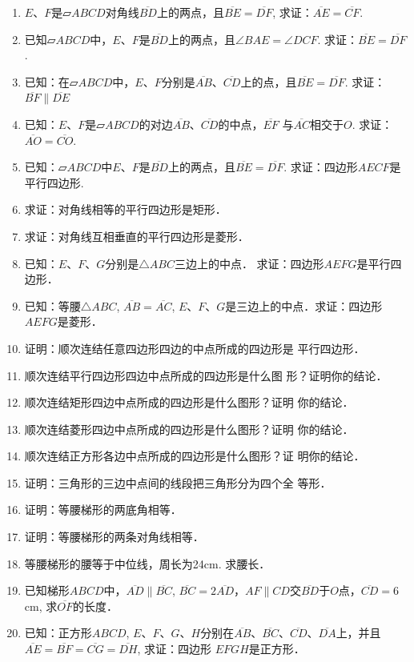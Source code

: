 \begin{ex}
\begin{enumerate}
    \item $E$、$F$是$\parallelogram ABCD$对角线$\overline{BD}$上的两点，且$\overline{BE}=\overline{DF}$,  求证：$\overline{AE}=\overline{CF}$.
    \item 已知$\parallelogram ABCD$中，$E$、$F$是$\overline{BD}$上的两点，且$\angle BAE=\angle DCF$.  求证：$\overline{BE}=\overline{DF}$.
\item 已知：在$\parallelogram ABCD$中，$E$、$F$分别是$\overline{AB}$、$\overline{CD}$上的点，且$\overline{BE}=\overline{DF}$. 求证：$\overline{BF}\parallel\overline{DE}$

\item 已知：$E$、$F$是$\parallelogram ABCD$的对边$\overline{AB}$、$\overline{CD}$的中点，$\overline{EF}$
与$\overline{AC}$相交于$O$. 求证：$\overline{AO}=\overline{CO}$.
\item 已知：$\parallelogram ABCD$中$E$、$F$是$\overline{BD}$上的两点，且$\overline{BE}=\overline{DF}$. 求证：四边形$AECF$是平行四边形.
\item 求证：对角线相等的平行四边形是矩形．
\item 求证：对角线互相垂直的平行四边形是菱形．
\item 已知：$E$、$F$、$G$分别是$\triangle ABC$三边上的中点．
求证：四边形$AEFG$是平行四边形．
\item 已知：等腰$\triangle ABC$, $\overline{AB}=\overline{AC}$, $E$、$F$、$G$是三边上的中点．求证：四边形$AEFG$是菱形．
    
\item 证明：顺次连结任意四边形四边的中点所成的四边形是
平行四边形．
\item 顺次连结平行四边形四边中点所成的四边形是什么图
形？证明你的结论．
\item 顺次连结矩形四边中点所成的四边形是什么图形？证明
你的结论．
\item 顺次连结菱形四边中点所成的四边形是什么图形？证明
你的结论．
\item 顺次连结正方形各边中点所成的四边形是什么图形？证
明你的结论．
\item 证明：三角形的三边中点间的线段把三角形分为四个全
等形．
\item 证明：等腰梯形的两底角相等．
\item 证明：等腰梯形的两条对角线相等．
\item 等腰梯形的腰等于中位线，周长为24cm. 求腰长．
\item 已知梯形$ABCD$中，$\overline{AD}\parallel \overline{BC}$, $\overline{BC}=2\overline{AD}$，$AF\parallel CD$交$\overline{BD}$于$O$点，$\overline{CD}=6$cm, 求$\overline{OF}$的长度．

\item 已知：正方形$ABCD$, $E$、$F$、$G$、$H$分别在$\overline{AB}$、$\overline{BC}$、$\overline{CD}$、$\overline{DA}$上，并且$\overline{AE}=\overline{BF}=\overline{CG}=\overline{DH}$, 求证：四边形
$EFGH$是正方形．
\end{enumerate}
\end{ex}



